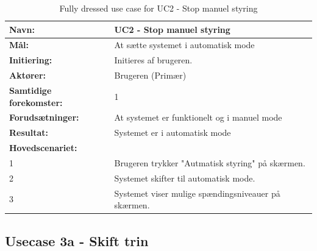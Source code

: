 \begin{table}[H]
	\centering
	
	\begin{threeparttable}
		\begin{tabularx}{\linewidth}{ l X }
			\toprule
			\bfseries{Navn:}				& UC2 - Stop manuel styring  \\
			\midrule
			\bfseries{Mål:} 				& At sætte systemet i automatisk mode \\
			\midrule
			\bfseries{Initiering:} 			& Initieres af brugeren. \\
			\midrule
			\bfseries{Aktører:} 			& Brugeren (Primær) \\
			\midrule
			\bfseries{Samtidige forekomster:} & 1 \\
			\midrule
			\bfseries{Forudsætninger:} 		& At systemet er funktionelt og i manuel mode\\
			\midrule
			\bfseries{Resultat:} 			& Systemet er i automatisk mode \\
			\midrule
			\bfseries{Hovedscenariet:} 	& \\
			
			
			1 	& Brugeren trykker "Autmatisk styring" på skærmen.\\
			2 	& Systemet skifter til automatisk mode.\\
			3 	& Systemet viser mulige spændingsniveauer på skærmen. 	\\		
				
			
			\bottomrule
			
		\end{tabularx}
	\end{threeparttable}
	\caption{Fully dressed use case for UC2 - Stop manuel styring}
	\label{table:UC2}
\end{table}

\subsection{Usecase 3a - Skift trin}

